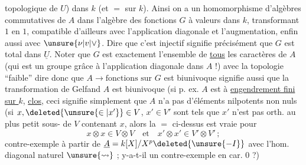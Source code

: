 topologique de $U$) dans $k$ (et $=$ sur $k$). Ainsi
on a un  homomorphisme d'algèbres
commutatives de $A$ dans l'algèbre des fonctions
 $G$ à valeurs dans $k$, transformant $1$ en $1$, compatible
d'ailleurs avec l'application diagonale et
l'augmentation, enfin aussi avec $\unsure{\nu|v|\vee}$. Dire que
c'est injectif signifie précisément que
$G$ est total dans $\underline U$. Noter que $G$ est exactement
l'ensemble de \uline{tous} les caractères de $A$
(qui est un groupe grâce à l'application
diagonale dans $A$ !) avec la topologie ``faible''
dire donc que $A\to\text{fonctions sur }G$ est
biunivoque signifie aussi que la transformation
de Gelfand  $A$ est biunivoque (si p. ex. $A$
est à \uline{engendrement fini sur $k$}, 
\uline{clos}, ceci signifie simplement que $A$ n'a pas
d'éléments nilpotents non nuls (si $x,\deleted{\unsure{\in|x'}}\in V$, $x'\in V'$
sont tels que $x'$ n'est pas orth. au plus
petit sous- de $V$ contenant $x$,
alors la $=$ ci-dessus est vraie pour
\[
x\otimes x\in V\otimes V\quad\text{et}\quad x'\otimes x'\in V'\otimes V'\,;
\]
contre-exemple  à partir de $\underline A=k[X]/X^p\deleted{\unsure{-I}}$
 avec l'hom. diagonal naturel $\unsure{\leadsto}$ ; y-a-t-il un
 contre-exemple en car. $0$ ?)
